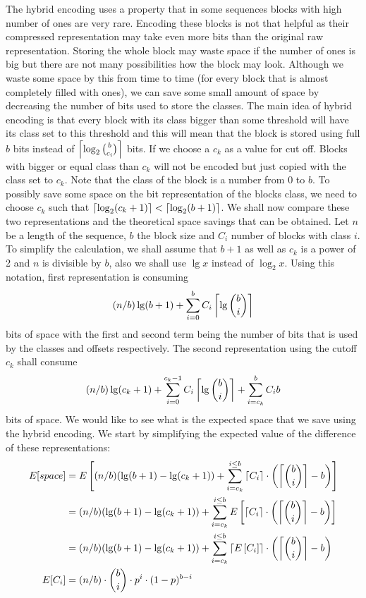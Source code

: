 The hybrid encoding uses a property that in some sequences blocks with high number
of ones are very rare. Encoding these blocks is not that helpful as their
compressed representation may take even more bits than the original raw
representation. Storing the whole block may waste space if the number of
ones is big but there are not many possibilities how the block may look.
Although we waste some space by this from time to time (for every
block that is almost completely filled with ones), we can save some small
amount of space by decreasing the number of bits used to store the classes.
The main idea of hybrid encoding is that every block with its
class bigger than some threshold will have its class set to this threshold
and this will mean that the block is stored using full $b$ bits instead of
$\left\lceil \log_2{b\choose c_i} \right\rceil$ bits. If we choose a $c_k$ as a value for cut off.
Blocks with bigger or equal class than $c_k$ will not be encoded but just
copied with the class set to $c_k$. Note that the class of the block
is a number from 0 to $b$. To possibly save some space on the bit representation
of the blocks class, we need to choose $c_k$ such that $\left\lceil \log_2(c_k+1) \right\rceil < \left\lceil \log_2(b+1) \right\rceil$.
We shall now compare these two representations and the theoretical space savings that
can be obtained. Let $n$ be a length of the sequence, $b$ the block size and $C_i$
number of blocks with class $i$. To simplify the calculation, we shall assume that $b+1$
as well as $c_k$ is a power of 2 and $n$ is divisible by $b$, also we shall
use $\lg x$ instead of $\log_2 x$. Using this notation, first representation is
consuming $$(n/b)\lg (b+1) + \sum_{i=0}^{b} C_i\left\lceil \lg {b\choose i} \right\rceil$$
bits of space with the first and second term being the number of bits that
is used by the classes and offsets respectively. The second representation
using the cutoff $c_k$ shall consume $$(n/b)\lg (c_k+1)+\sum_{i=0}^{c_k-1}C_i\left\lceil \lg {b\choose i} \right\rceil + \sum_{i=c_k}^{b}C_i b$$
bits of space. We would like to see what is the expected space that we save
using the hybrid encoding. We start by simplifying the expected value of the
difference of these representations:
\begin{align}
E[space] &= E\left[(n/b)(\lg(b+1)-\lg(c_k+1)) + \sum_{i=c_k}^{i\leq b}\left\lceil C_i \right\rceil\cdot \left(\left\lceil {b\choose i} \right\rceil - b\right)\right] \nonumber\\
&=(n/b)(\lg(b+1)-\lg(c_k+1)) + \sum_{i=c_k}^{i\leq b}E\left[\left\lceil C_i \right\rceil\cdot \left(\left\lceil {b\choose i} \right\rceil - b\right)\right] \nonumber\\
&=(n/b)(\lg(b+1)-\lg(c_k+1)) + \sum_{i=c_k}^{i\leq b}\left\lceil E\left[C_i\right] \right\rceil\cdot \left(\left\lceil {b\choose i} \right\rceil - b\right) \nonumber\\
E[C_i] &= (n/b)\cdot {b\choose i}\cdot p^i\cdot (1-p)^{b-i} \label{eq:hybrid_encoding_expected_c_i}
\end{align}

